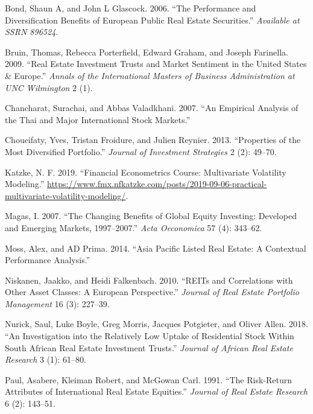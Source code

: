\documentclass[11pt,preprint, authoryear]{elsarticle}
\numberwithin{equation}{section}
\numberwithin{figure}{section}
\numberwithin{table}{section}
\begin{document}
\leavevmode\hypertarget{ref-bond2006performance}{}%
Bond, Shaun A, and John L Glascock. 2006. ``The Performance and
Diversification Benefits of European Public Real Estate Securities.''
\emph{Available at SSRN 896524}.

\leavevmode\hypertarget{ref-bruin2009real}{}%
Bruin, Thomas, Rebecca Porterfield, Edward Graham, and Joseph Farinella.
2009. ``Real Estate Investment Trusts and Market Sentiment in the United
States \& Europe.'' \emph{Annals of the International Masters of
Business Administration at UNC Wilmington} 2 (1).

\leavevmode\hypertarget{ref-chancharat2007empirical}{}%
Chancharat, Surachai, and Abbas Valadkhani. 2007. ``An Empirical
Analysis of the Thai and Major International Stock Markets.''

\leavevmode\hypertarget{ref-choueifaty2013properties}{}%
Choueifaty, Yves, Tristan Froidure, and Julien Reynier. 2013.
``Properties of the Most Diversified Portfolio.'' \emph{Journal of
Investment Strategies} 2 (2): 49--70.

\leavevmode\hypertarget{ref-katzke2019multivariate}{}%
Katzke, N. F. 2019. ``Financial Econometrics Course: Multivariate
Volatility Modeling.''
\url{https://www.fmx.nfkatzke.com/posts/2019-09-06-practical-multivariate-volatility-modeling/}.

\leavevmode\hypertarget{ref-magas2007changing}{}%
Magas, I. 2007. ``The Changing Benefits of Global Equity Investing:
Developed and Emerging Markets, 1997--2007.'' \emph{Acta Oeconomica} 57
(4): 343--62.

\leavevmode\hypertarget{ref-moss2014asia}{}%
Moss, Alex, and AD Prima. 2014. ``Asia Pacific Listed Real Estate: A
Contextual Performance Analysis.''

\leavevmode\hypertarget{ref-niskanen2010reits}{}%
Niskanen, Jaakko, and Heidi Falkenbach. 2010. ``REITs and Correlations
with Other Asset Classes: A European Perspective.'' \emph{Journal of
Real Estate Portfolio Management} 16 (3): 227--39.

\leavevmode\hypertarget{ref-nurick2018investigation}{}%
Nurick, Saul, Luke Boyle, Greg Morris, Jacques Potgieter, and Oliver
Allen. 2018. ``An Investigation into the Relatively Low Uptake of
Residential Stock Within South African Real Estate Investment Trusts.''
\emph{Journal of African Real Estate Research} 3 (1): 61--80.

\leavevmode\hypertarget{ref-paul1991risk}{}%
Paul, Asabere, Kleiman Robert, and McGowan Carl. 1991. ``The Risk-Return
Attributes of International Real Estate Equities.'' \emph{Journal of
Real Estate Research} 6 (2): 143--51.
\end{document}
